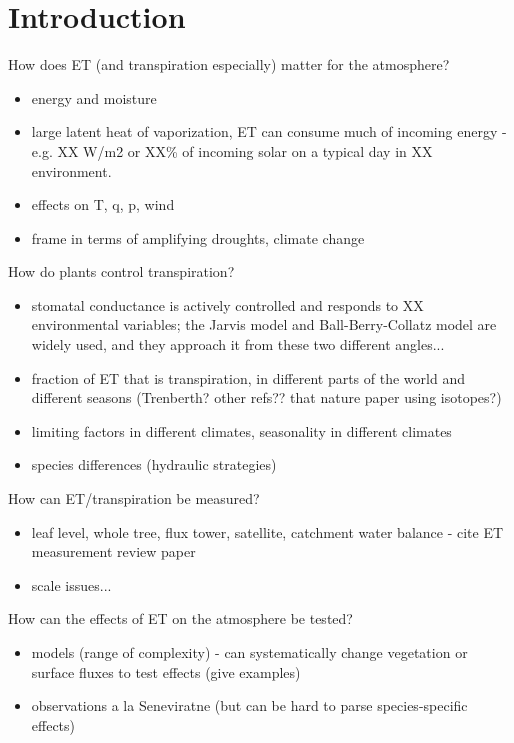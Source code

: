 \chapter{Introduction}
\label{c.intro}

How does ET (and transpiration especially) matter for the atmosphere?
\begin{itemize}
\item energy and moisture
\item large latent heat of vaporization, ET can consume much of incoming energy - e.g. XX W/m2 or XX\% of incoming solar on a typical day in XX environment.
\item effects on T, q, p, wind
\item frame in terms of amplifying droughts, climate change
\end{itemize}

How do plants control transpiration?
\begin{itemize}
\item stomatal conductance is actively controlled and responds to XX environmental variables; the Jarvis model and Ball-Berry-Collatz model are widely used, and they approach it from these two different angles...
\item fraction of ET that is transpiration, in different parts of the world and different seasons (Trenberth?  other refs?? that nature paper using isotopes?)
\item limiting factors in different climates, seasonality in different climates
\item species differences (hydraulic strategies)
\end{itemize}

How can ET/transpiration be measured?
\begin{itemize}
\item leaf level, whole tree, flux tower, satellite, catchment water balance - cite ET measurement review paper
\item scale issues...
\end{itemize}

How can the effects of ET on the atmosphere be tested?
\begin{itemize}
\item models (range of complexity) - can systematically change vegetation or surface fluxes to test effects (give examples)
\item observations a la Seneviratne (but can be hard to parse species-specific effects)
\end{itemize}

